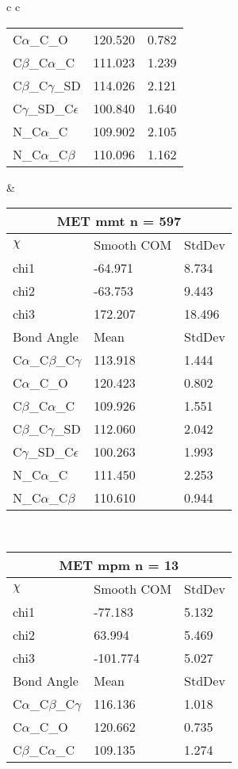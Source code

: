 \begin{longtable}{ c c }
\begin{tabular}{ l l l }
  C$\alpha$\_C\_O & 120.520 & 0.782\\
  C$\beta$\_C$\alpha$\_C & 111.023 & 1.239\\
  C$\beta$\_C$\gamma$\_SD & 114.026 & 2.121\\
  C$\gamma$\_SD\_C$\epsilon$ & 100.840 & 1.640\\
  N\_C$\alpha$\_C & 109.902 & 2.105\\
  N\_C$\alpha$\_C$\beta$ & 110.096 & 1.162\\
  \bottomrule
  \end{tabular}
  &
  \begin{tabular}{ l l l }
  \toprule
  \multicolumn{3}{c}{MET \textbf{mmt} n = 597} \\ \toprule
  $\chi$       & Smooth COM & StdDev \\ \midrule
  chi1 & -64.971 & 8.734 \\ 
  chi2 & -63.753 & 9.443 \\ 
  chi3 & 172.207 & 18.496 \\ \midrule
  Bond Angle   & Mean     & StdDev \\ \midrule
  C$\alpha$\_C$\beta$\_C$\gamma$ & 113.918 & 1.444\\
  C$\alpha$\_C\_O & 120.423 & 0.802\\
  C$\beta$\_C$\alpha$\_C & 109.926 & 1.551\\
  C$\beta$\_C$\gamma$\_SD & 112.060 & 2.042\\
  C$\gamma$\_SD\_C$\epsilon$ & 100.263 & 1.993\\
  N\_C$\alpha$\_C & 111.450 & 2.253\\
  N\_C$\alpha$\_C$\beta$ & 110.610 & 0.944\\
  \bottomrule
  \end{tabular}
  \\
  \begin{tabular}{ l l l }
  \toprule
  \multicolumn{3}{c}{MET \textbf{mpm} n = 13} \\ \toprule
  $\chi$       & Smooth COM & StdDev \\ \midrule
  chi1 & -77.183 & 5.132 \\ 
  chi2 & 63.994 & 5.469 \\ 
  chi3 & -101.774 & 5.027 \\ \midrule
  Bond Angle   & Mean     & StdDev \\ \midrule
  C$\alpha$\_C$\beta$\_C$\gamma$ & 116.136 & 1.018\\
  C$\alpha$\_C\_O & 120.662 & 0.735\\
  C$\beta$\_C$\alpha$\_C & 109.135 & 1.274\\

\end{tabular}
\end{longtable}
